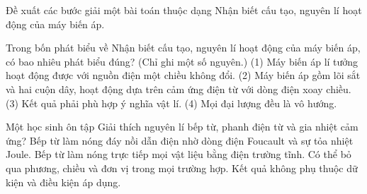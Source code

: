 \begin{bt}
Đề xuất các bước giải một bài toán thuộc dạng Nhận biết cấu tạo, nguyên lí hoạt động của máy biến áp.
\end{bt}

\begin{ex}
Trong bốn phát biểu về Nhận biết cấu tạo, nguyên lí hoạt động của máy biến áp, có bao nhiêu phát biểu đúng? (Chỉ ghi một số nguyên.) (1) Máy biến áp lí tưởng hoạt động được với nguồn điện một chiều không đổi. (2) Máy biến áp gồm lõi sắt và hai cuộn dây, hoạt động dựa trên cảm ứng điện từ với dòng điện xoay chiều. (3) Kết quả phải phù hợp ý nghĩa vật lí. (4) Mọi đại lượng đều là vô hướng.
\end{ex}

\begin{ex}
Một học sinh ôn tập Giải thích nguyên lí bếp từ, phanh điện từ và gia nhiệt cảm ứng?
\choice
{\True Bếp từ làm nóng đáy nồi dẫn điện nhờ dòng điện Foucault và sự tỏa nhiệt Joule.}
{Bếp từ làm nóng trực tiếp mọi vật liệu bằng điện trường tĩnh.}
{Có thể bỏ qua phương, chiều và đơn vị trong mọi trường hợp.}
{Kết quả không phụ thuộc dữ kiện và điều kiện áp dụng.}
\end{ex}

